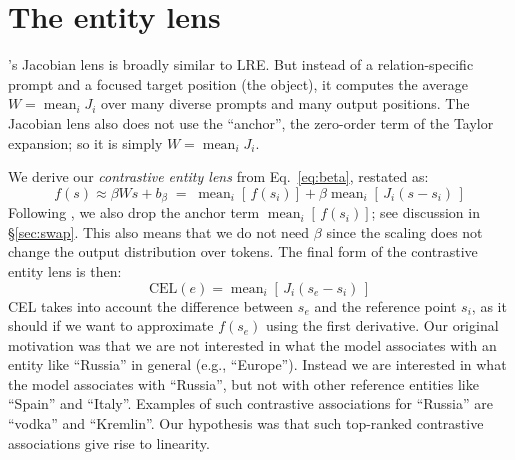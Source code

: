 \section{The entity lens}
\label{sec:lens}


\citet{gurnee2026workspace}'s Jacobian lens is broadly
similar to LRE.  But
instead of a relation-specific prompt and a focused target
position (the object),
it computes the average 
$W = \operatorname{mean}_i J_i$ over many diverse prompts and many
output positions. The Jacobian lens also does not use the
``anchor'', the zero-order term of the Taylor expansion; so it
is simply $W = \operatorname{mean}_i J_i$.

We derive our \emph{contrastive entity lens} from
Eq.~\ref{eq:beta}, restated as:
\begin{equation}
  f(s) \approx
\beta W s + b_\beta \;=\;
\operatorname{mean}_i\!\left[\,f(s_i)\right]
+ \beta\operatorname{mean}_i\!\left[\, J_i (s - s_i)\,\right]
\end{equation}
Following \citet{gurnee2026workspace}, we also drop the anchor
term $\operatorname{mean}_i\!\left[\,f(s_i)\right]$; see discussion in 
\S\ref{sec:swap}.
This also means that we do not need $\beta$ since the
scaling does not change the output distribution over
tokens. The final form of the contrastive entity lens is then:
\begin{equation}
\mbox{CEL}(e) = \operatorname{mean}_i\!\left[\, J_i (s_e - s_i)\,\right]
\label{eq:cel}
\end{equation}
CEL takes into account the difference between $s_e$ and
the reference point $s_i$, as it should if we want
to approximate $f(s_e)$ using the first derivative. 
Our original motivation was that we are not interested in what the model associates
with an entity like ``Russia'' in general (e.g.,
``Europe''). Instead we are interested in what the model
associates with ``Russia'', but not with other reference
entities like ``Spain'' and ``Italy''. Examples of such
contrastive associations for ``Russia'' are ``vodka'' and ``Kremlin''.
Our hypothesis was that such top-ranked contrastive associations
give rise to linearity.

